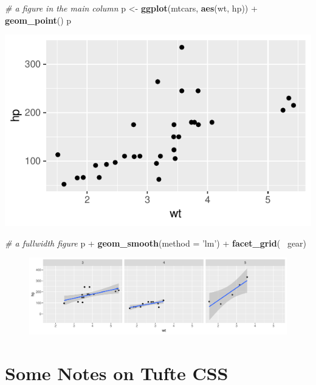 \documentclass[]{tufte-handout}
\newenvironment{Shaded}{}{}
\newcommand{\CommentTok}[1]{\textcolor[rgb]{0.38,0.63,0.69}{\textit{#1}}}
\newcommand{\DataTypeTok}[1]{\textcolor[rgb]{0.56,0.13,0.00}{#1}}
\newcommand{\KeywordTok}[1]{\textcolor[rgb]{0.00,0.44,0.13}{\textbf{#1}}}
\newcommand{\NormalTok}[1]{#1}
\newcommand{\OperatorTok}[1]{\textcolor[rgb]{0.40,0.40,0.40}{#1}}
\newcommand{\StringTok}[1]{\textcolor[rgb]{0.25,0.44,0.63}{#1}}
\begin{document}
\begin{Shaded}
\begin{Highlighting}[]
\CommentTok{# a figure in the main column}
\NormalTok{p <-}\StringTok{ }\KeywordTok{ggplot}\NormalTok{(mtcars, }\KeywordTok{aes}\NormalTok{(wt, hp)) }\OperatorTok{+}\StringTok{ }\KeywordTok{geom_point}\NormalTok{()}
\NormalTok{p}
\end{Highlighting}
\end{Shaded}

\includegraphics{Epi_Notes_files/figure-latex/fig-nocap-main-1}

\begin{Shaded}
\begin{Highlighting}[]
\CommentTok{# a fullwidth figure}
\NormalTok{p }\OperatorTok{+}\StringTok{ }\KeywordTok{geom_smooth}\NormalTok{(}\DataTypeTok{method =} \StringTok{'lm'}\NormalTok{) }\OperatorTok{+}\StringTok{ }\KeywordTok{facet_grid}\NormalTok{(}\OperatorTok{~}\StringTok{ }\NormalTok{gear)}
\end{Highlighting}
\end{Shaded}

\begin{figure}
\includegraphics{Epi_Notes_files/figure-latex/fig-nocap-fullwidth-1} \end{figure}

\hypertarget{some-notes-on-tufte-css}{%
\section{Some Notes on Tufte CSS}\label{some-notes-on-tufte-css}}
\end{document}
